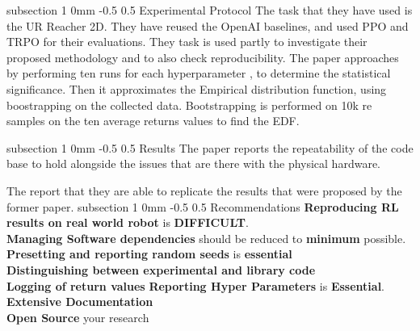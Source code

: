 \documentclass[twocolumn,11pt]{article}
\makeatletter
\renewcommand{\subsection}{\@startsection
{subsection}%
{1}%
{0mm}%
{-0.5\baselineskip}%
{0.5\baselineskip}%
{\bfseries\color{blue}}} %
\makeatother
\begin{document}
\subsection{Experimental Protocol}
The task that  they have used is the  UR Reacher 2D. They have reused the OpenAI baselines, and used PPO and TRPO for their evaluations. 
They task is used partly to investigate  their proposed methodology and to  also check reproducibility. 
The paper approaches by performing ten runs for each  hyperparameter ,  to determine the statistical significance. Then it approximates the Empirical  distribution function,  using boostrapping on the collected data. 
Bootstrapping is performed on 10k re samples on the ten average  returns  values to find the  EDF. 

\subsection{Results}
The paper reports  the repeatability of the code base  to hold alongside the issues that are there  with the  physical hardware. 

The report that they are able to replicate the results that were proposed by  the former paper.
\subsection{Recommendations}
\textbf{Reproducing RL results on real world robot} is \textbf{DIFFICULT}.\\
\textbf{Managing Software dependencies} should be reduced to \textbf{minimum} possible. \\
\textbf{Presetting and reporting random seeds}  is \textbf{essential}\\
\textbf{Distinguishing between experimental and library code}\\
\textbf{Logging of return values}
\textbf{Reporting Hyper Parameters} is \textbf{Essential}.\\
\textbf{Extensive  Documentation}\\
\textbf{Open Source }  your research  




\end{document}
